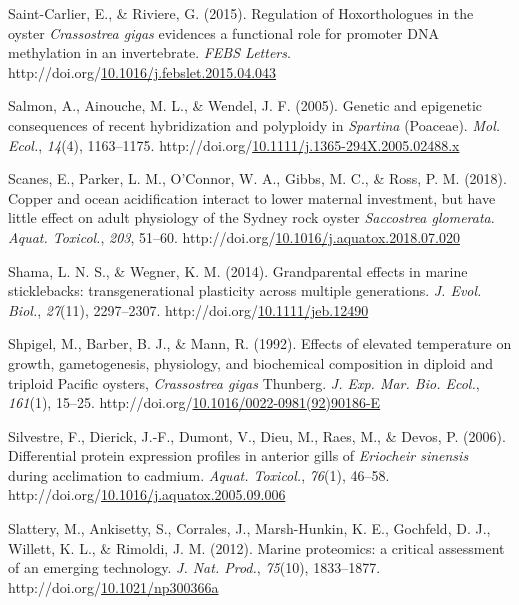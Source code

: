\documentclass [11pt, proquest] {uwthesis}[2015/03/03]
\newlength{\cslhangindent}
\newenvironment{CSLReferences}%
{\setlength{\parindent}{0pt}%
\everypar{\setlength{\hangindent}{\cslhangindent}}\ignorespaces}%
{\par}
\begin{document}
\begin{CSLReferences}{1}{0}
\leavevmode\hypertarget{ref-Saint-Carlier2015}{}%
Saint-Carlier, E., \& Riviere, G. (2015). {Regulation of Hoxorthologues in the oyster \emph{Crassostrea gigas} evidences a functional role for promoter DNA methylation in an invertebrate}. \emph{FEBS Letters}. http://doi.org/\href{https://doi.org/10.1016/j.febslet.2015.04.043}{10.1016/j.febslet.2015.04.043}

\leavevmode\hypertarget{ref-Salmon2005}{}%
Salmon, A., Ainouche, M. L., \& Wendel, J. F. (2005). {Genetic and epigenetic consequences of recent hybridization and polyploidy in \emph{Spartina} (Poaceae)}. \emph{Mol. Ecol.}, \emph{14}(4), 1163--1175. http://doi.org/\href{https://doi.org/10.1111/j.1365-294X.2005.02488.x}{10.1111/j.1365-294X.2005.02488.x}

\leavevmode\hypertarget{ref-Scanes2018}{}%
Scanes, E., Parker, L. M., O'Connor, W. A., Gibbs, M. C., \& Ross, P. M. (2018). {Copper and ocean acidification interact to lower maternal investment, but have little effect on adult physiology of the Sydney rock oyster \emph{Saccostrea glomerata}}. \emph{Aquat. Toxicol.}, \emph{203}, 51--60. http://doi.org/\href{https://doi.org/10.1016/j.aquatox.2018.07.020}{10.1016/j.aquatox.2018.07.020}

\leavevmode\hypertarget{ref-Shama2014}{}%
Shama, L. N. S., \& Wegner, K. M. (2014). {Grandparental effects in marine sticklebacks: transgenerational plasticity across multiple generations}. \emph{J. Evol. Biol.}, \emph{27}(11), 2297--2307. http://doi.org/\href{https://doi.org/10.1111/jeb.12490}{10.1111/jeb.12490}

\leavevmode\hypertarget{ref-Shpigel1992}{}%
Shpigel, M., Barber, B. J., \& Mann, R. (1992). {Effects of elevated temperature on growth, gametogenesis, physiology, and biochemical composition in diploid and triploid Pacific oysters, \emph{Crassostrea gigas} Thunberg}. \emph{J. Exp. Mar. Bio. Ecol.}, \emph{161}(1), 15--25. http://doi.org/\href{https://doi.org/10.1016/0022-0981(92)90186-E}{10.1016/0022-0981(92)90186-E}

\leavevmode\hypertarget{ref-Silvestre2006}{}%
Silvestre, F., Dierick, J.-F., Dumont, V., Dieu, M., Raes, M., \& Devos, P. (2006). {Differential protein expression profiles in anterior gills of \emph{Eriocheir sinensis} during acclimation to cadmium}. \emph{Aquat. Toxicol.}, \emph{76}(1), 46--58. http://doi.org/\href{https://doi.org/10.1016/j.aquatox.2005.09.006}{10.1016/j.aquatox.2005.09.006}

\leavevmode\hypertarget{ref-Slattery2012}{}%
Slattery, M., Ankisetty, S., Corrales, J., Marsh-Hunkin, K. E., Gochfeld, D. J., Willett, K. L., \& Rimoldi, J. M. (2012). {Marine proteomics: a critical assessment of an emerging technology}. \emph{J. Nat. Prod.}, \emph{75}(10), 1833--1877. http://doi.org/\href{https://doi.org/10.1021/np300366a}{10.1021/np300366a}


\end{CSLReferences}
\end{document}

